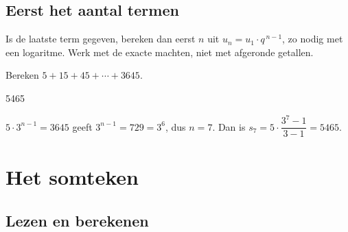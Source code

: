 \subsection{Eerst het aantal termen}

\begin{werkwijze}
Is de laatste term gegeven, bereken dan eerst $n$ uit $u_n = u_1 \cdot q^{\,n-1}$, zo nodig met een logaritme. Werk met de exacte machten, niet met afgeronde getallen.
\end{werkwijze}



\begin{oefeningen}
\begin{oefening}
Bereken $5 + 15 + 45 + \cdots + 3645$.
\begin{solution}
5465
\end{solution}
\begin{fullsolution}
$5\cdot 3^{n-1}=3645$ geeft $3^{n-1}=729=3^6$, dus $n=7$. Dan is $s_7=5\cdot\dfrac{3^7-1}{3-1}=5465$.
\end{fullsolution}
\end{oefening}
\end{oefeningen}

\section{Het somteken}

\subsection{Lezen en berekenen}

